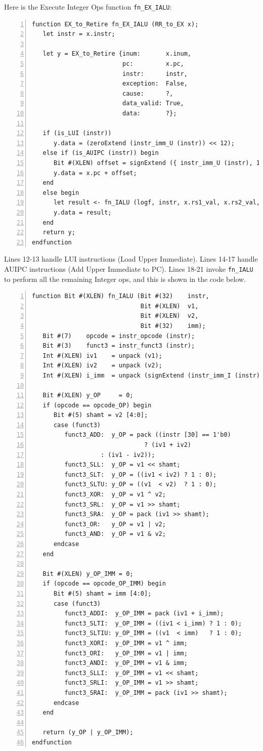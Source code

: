 Here is the Execute Integer Ops function \verb|fn_EX_IALU|:

{\small
\begin{Verbatim}[frame=single, numbers=left]
function EX_to_Retire fn_EX_IALU (RR_to_EX x);
   let instr = x.instr;

   let y = EX_to_Retire {inum:       x.inum,
                         pc:         x.pc,
                         instr:      instr,
                         exception:  False,
                         cause:      ?,
                         data_valid: True,
                         data:       ?};

   if (is_LUI (instr))
      y.data = (zeroExtend (instr_imm_U (instr)) << 12);
   else if (is_AUIPC (instr)) begin
      Bit #(XLEN) offset = signExtend ({ instr_imm_U (instr), 12'b0 });
      y.data = x.pc + offset;
   end
   else begin
      let result <- fn_IALU (logf, instr, x.rs1_val, x.rs2_val, x.imm);
      y.data = result;
   end
   return y;
endfunction
\end{Verbatim}
}

Lines 12-13 handle LUI instructions (Load Upper Immediate).  Lines
14-17 handle AUIPC instructions (Add Upper Immediate to PC).  Lines
18-21 invoke {\tt fn\_IALU} to perform all the remaining Integer ops,
and this is shown in the code below.

{\small
\begin{Verbatim}[frame=single, numbers=left]
function Bit #(XLEN) fn_IALU (Bit #(32)    instr,
                              Bit #(XLEN)  v1,
                              Bit #(XLEN)  v2,
                              Bit #(32)    imm);
   Bit #(7)    opcode = instr_opcode (instr);
   Bit #(3)    funct3 = instr_funct3 (instr);
   Int #(XLEN) iv1    = unpack (v1);
   Int #(XLEN) iv2    = unpack (v2);
   Int #(XLEN) i_imm  = unpack (signExtend (instr_imm_I (instr)));

   Bit #(XLEN) y_OP     = 0;
   if (opcode == opcode_OP) begin
      Bit #(5) shamt = v2 [4:0];
      case (funct3)
         funct3_ADD:  y_OP = pack ((instr [30] == 1'b0)
	                           ? (iv1 + iv2)
				   : (iv1 - iv2));
         funct3_SLL:  y_OP = v1 << shamt;
         funct3_SLT:  y_OP = ((iv1 < iv2) ? 1 : 0);
         funct3_SLTU: y_OP = ((v1  < v2)  ? 1 : 0);
         funct3_XOR:  y_OP = v1 ^ v2;
         funct3_SRL:  y_OP = v1 >> shamt;
         funct3_SRA:  y_OP = pack (iv1 >> shamt);
         funct3_OR:   y_OP = v1 | v2;
         funct3_AND:  y_OP = v1 & v2;
      endcase
   end

   Bit #(XLEN) y_OP_IMM = 0;
   if (opcode == opcode_OP_IMM) begin
      Bit #(5) shamt = imm [4:0];
      case (funct3)
         funct3_ADDI:  y_OP_IMM = pack (iv1 + i_imm);
         funct3_SLTI:  y_OP_IMM = ((iv1 < i_imm) ? 1 : 0);
         funct3_SLTIU: y_OP_IMM = ((v1  < imm)   ? 1 : 0);
         funct3_XORI:  y_OP_IMM = v1 ^ imm;
         funct3_ORI:   y_OP_IMM = v1 | imm;
         funct3_ANDI:  y_OP_IMM = v1 & imm;
         funct3_SLLI:  y_OP_IMM = v1 << shamt;
         funct3_SRLI:  y_OP_IMM = v1 >> shamt;
         funct3_SRAI:  y_OP_IMM = pack (iv1 >> shamt);
      endcase
   end

   return (y_OP | y_OP_IMM);
endfunction
\end{Verbatim}
}

